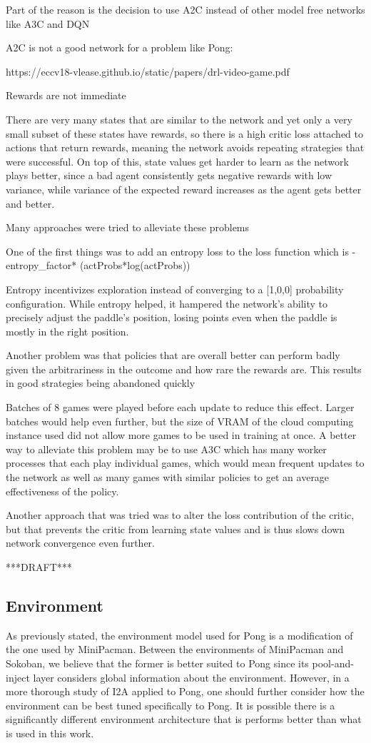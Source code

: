\documentclass[10pt, twocolumn]{article}
\begin{document}
Part of the reason is the decision to use A2C instead of other model free networks like A3C and DQN

A2C is not a good network for a problem like Pong:

	https://eccv18-vlease.github.io/static/papers/drl-video-game.pdf

	Rewards are not immediate

	There are very many states that are similar to the network and yet only a very small subset of these states have rewards, so there is a high critic loss attached to actions that return rewards, meaning the network avoids repeating strategies that were successful. On top of this, state values get harder to learn as the network plays better, since a bad agent consistently gets negative rewards with low variance, while variance of the expected reward increases as the agent gets better and better.

Many approaches were tried to alleviate these problems

	One of the first things was to add an entropy loss to the loss function which is  -entropy_factor* (actProbs*log(actProbs))

	Entropy incentivizes exploration instead of converging to a [1,0,0] probability configuration. 
	While entropy helped, it hampered the network’s ability to precisely adjust the paddle’s position, losing points even when the paddle is mostly in the right position.

	Another problem was that policies that are overall better can perform badly given the arbitrariness in the outcome and how rare the rewards are.
	This results in good strategies being abandoned quickly 

	Batches of 8 games were played before each update to reduce this effect. Larger batches would help even further, but the size of VRAM of the cloud computing instance used did not allow more games to be used in training at once. A better way to alleviate this problem may be to use A3C which has many worker processes that each play individual games, which would mean frequent updates to the network as well as many games with similar policies to get an average effectiveness of the policy. 

	Another approach that was tried was to alter the loss contribution of the critic, but that prevents the critic from learning state values and is thus slows down network convergence even further.

***DRAFT***

\subsection{Environment}
As previously stated, the environment model used for Pong is a modification of the one used by MiniPacman. Between the environments of MiniPacman and Sokoban, we believe that the former is better suited to Pong since its pool-and-inject layer considers global information about the environment. However, in a more thorough study of I2A applied to Pong, one should further consider how the environment can be best tuned specifically to Pong. It is possible there is a significantly different environment architecture that is performs better than what is used in this work.
\end{document}
